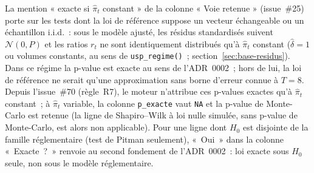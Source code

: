 \documentclass[a4paper,11pt]{article}
\newcommand{\code}[1]{\texttt{\small #1}}
\begin{document}
La mention « exacte si $\hat\pi_t$ constant » de la colonne « Voie retenue » (issue~\#25) porte
sur les tests dont la loi de référence suppose un vecteur échangeable ou un échantillon i.i.d.~:
sous le modèle ajusté, les résidus standardisés suivent $\mathcal{N}(0, P)$ et les ratios $r_t$
ne sont identiquement distribués qu'à $\hat\pi_t$ constant ($\hat\delta = 1$ ou volumes
constants, au sens de \code{usp\_regime()}~; section~\ref{sec:base-residus}). Dans ce régime la
p-value est exacte au sens de l'ADR~0002~; hors de lui, la loi de référence ne serait qu'une
approximation sans borne d'erreur connue à $T = 8$. Depuis l'issue~\#70 (règle~R7), le moteur
n'attribue ces p-values exactes qu'à $\hat\pi_t$ constant~; à $\hat\pi_t$ variable, la colonne
\code{p\_exacte} vaut \code{NA} et la p-value de Monte-Carlo est retenue (la ligne de Shapiro--Wilk
à loi nulle simulée, sans p-value de Monte-Carlo, est alors non applicable). Pour une ligne dont
$H_0$ est disjointe de la famille réglementaire (test de Pitman seulement), «~Oui~» dans la
colonne «~Exacte~?~» renvoie au second fondement de l'ADR~0002~: loi exacte sous $H_0$ seule, non
sous le modèle réglementaire.
\end{document}
